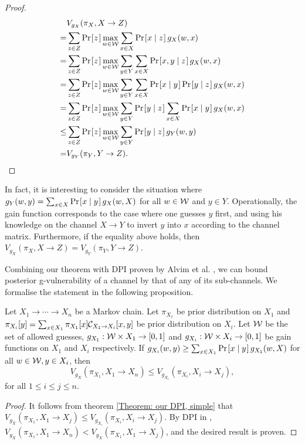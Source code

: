 \begin{proof}
\begin{align*}
  & V_{g_{X}}(\pi_X, X \rightarrow Z) \\
= & \sum_{z \in Z} \prob{z} \max_{w \in \W} \sum_{x \in X} \prob{x \mid z} g_{X}(w, x) \\
= & \sum_{z \in Z} \prob{z} \max_{w \in \W} \sum_{y \in Y} \sum_{x \in X} \prob{x, y \mid z} g_{X}(w, x) \\
= & \sum_{z \in Z} \prob{z} \max_{w \in \W} \sum_{y \in Y} \sum_{x \in X} \prob{x \mid y} \prob{y \mid z} g_{X}(w, x) \\
= & \sum_{z \in Z} \prob{z} \max_{w \in \W} \sum_{y \in Y} \prob{y \mid z} \sum_{x \in X} \prob{x \mid y} g_{X}(w, x) \\
\leq & \sum_{z \in Z} \prob{z} \max_{w \in \W} \sum_{y \in Y} \prob{y \mid z} g_{Y}(w, y) \\
= & V_{g_{Y}}(\pi_Y, Y \rightarrow Z).
\end{align*}
\end{proof}

In fact, it is interesting to consider the situation where $g_{Y}(w, y) = \sum_{x \in X} \prob{x \mid y} g_{X}(w, X)$ for all $w \in \mathcal{W}$ and $y \in Y$. Operationally, the gain function corresponds to the case where one guesses $y$ first, and using his knowledge on the channel $X \rightarrow Y$ to invert $y$ into $x$ according to the channel matrix. Furthermore, if the equality above holds, then $V_{g_{X}}(\pi_X, X \rightarrow Z) = V_{g_{Y}}(\pi_Y, Y \rightarrow Z)$.

Combining our theorem with DPI proven by Alvim et al. \cite{6266165}, we can bound posterior g-vulnerability of a channel by that of any of its sub-channels. We formalise the statement in the following proposition.


\begin{proposition}
	\normalfont
	Let $X_1 \rightarrow \cdots \rightarrow X_n$ be a Markov chain. Let $\pi_{X_1}$ be prior distribution on $X_1$ and $\pi_{X_i}[y] = \sum_{x \in X_1} \pi_{X_1}[x] \mathcal{C}_{X_1 \rightarrow X_i}[x,y]$ be prior distribution on $X_i$. Let $\mathcal{W}$ be the set of allowed guesses, $g_{X_1}: \mathcal{W} \times X_1 \rightarrow [0,1]$ and $g_{X_i}: \mathcal{W} \times X_i \rightarrow [0,1]$ be gain functions on $X_1$ and $X_i$ respectively. If $g_{X_i}(w, y) \geq \sum_{x \in X_1} \prob{x \mid y} g_{X_1}(w, X)$ for all $w \in \mathcal{W}, y \in X_i$, then
	\begin{equation*}
	V_{g_{X}}(\pi_{X_1}, X_1 \rightarrow X_n) \leq V_{g_{X_i}}(\pi_{X_i}, X_i \rightarrow X_j),
	\end{equation*}
	for all $1 \leq i \leq j \leq n$.
\end{proposition}

\begin{proof}
	It follows from theorem \ref{Theorem: our DPI, simple} that $V_{g_{X}}(\pi_{X_1}, X_1 \rightarrow X_j) \leq V_{g_{X_i}}(\pi_{X_i}, X_i \rightarrow X_j)$. By DPI in \cite{6266165}, $V_{g_{X}}(\pi_{X_1}, X_1 \rightarrow X_n) < V_{g_{X}}(\pi_{X_1}, X_1 \rightarrow X_j)$, and the desired result is proven.
\end{proof}

 


